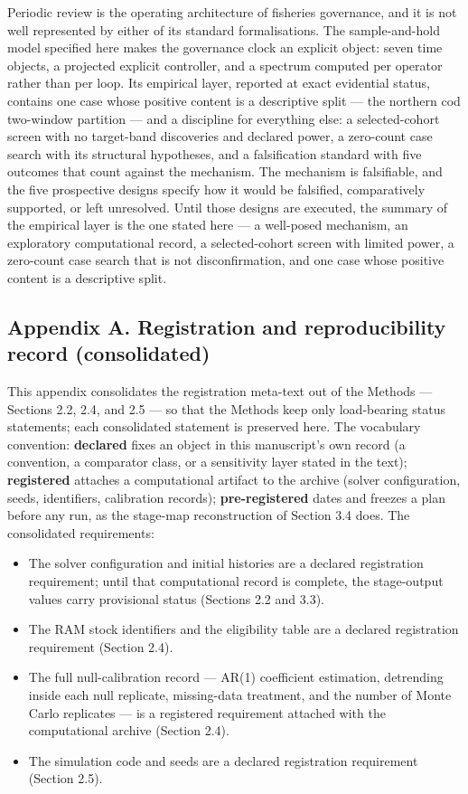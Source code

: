 \documentclass[11pt]{article}
\providecommand{\tightlist}{\setlength{\itemsep}{0pt}\setlength{\parskip}{0pt}}
\begin{document}
Periodic review is the operating architecture of fisheries governance,
and it is not well represented by either of its standard formalisations.
The sample-and-hold model specified here makes the governance clock an
explicit object: seven time objects, a projected explicit controller,
and a spectrum computed per operator rather than per loop. Its empirical
layer, reported at exact evidential status, contains one case whose
positive content is a descriptive split --- the northern cod two-window
partition --- and a discipline for everything else: a selected-cohort
screen with no target-band discoveries and declared power, a zero-count
case search with its structural hypotheses, and a falsification standard
with five outcomes that count against the mechanism. The mechanism is
falsifiable, and the five prospective designs specify how it would be
falsified, comparatively supported, or left unresolved. Until those
designs are executed, the summary of the empirical layer is the one
stated here --- a well-posed mechanism, an exploratory computational
record, a selected-cohort screen with limited power, a zero-count case
search that is not disconfirmation, and one case whose positive content
is a descriptive split.

\subsection{Appendix A. Registration and reproducibility record
(consolidated)}\label{appendix-a.-registration-and-reproducibility-record-consolidated}

This appendix consolidates the registration meta-text out of the Methods
--- Sections 2.2, 2.4, and 2.5 --- so that the Methods keep only
load-bearing status statements; each consolidated statement is preserved
here. The vocabulary convention: \textbf{declared} fixes an object in
this manuscript's own record (a convention, a comparator class, or a
sensitivity layer stated in the text); \textbf{registered} attaches a
computational artifact to the archive (solver configuration, seeds,
identifiers, calibration records); \textbf{pre-registered} dates and
freezes a plan before any run, as the stage-map reconstruction of
Section 3.4 does. The consolidated requirements:

\begin{itemize}
\tightlist
\item
  The solver configuration and initial histories are a declared
  registration requirement; until that computational record is complete,
  the stage-output values carry provisional status (Sections 2.2 and
  3.3).
\item
  The RAM stock identifiers and the eligibility table are a declared
  registration requirement (Section 2.4).
\item
  The full null-calibration record --- AR(1) coefficient estimation,
  detrending inside each null replicate, missing-data treatment, and the
  number of Monte Carlo replicates --- is a registered requirement
  attached with the computational archive (Section 2.4).
\item
  The simulation code and seeds are a declared registration requirement
  (Section 2.5).
\end{itemize}
\end{document}
